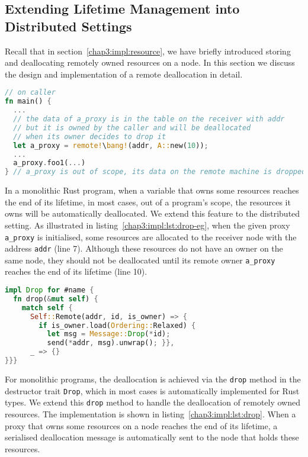 \subsection{Extending Lifetime Management into Distributed Settings}
\label{chap3:impl:lifetime}
Recall that in section~\ref{chap3:impl:resource}, we have briefly introduced storing and deallocating remotely owned resources on a node. In this section we discuss the design and implementation of a remote deallocation in detail. 
\begin{lstlisting}[language=Rust, style=boxed, basicstyle=\footnotesize\ttfamily, caption={An example of a remote deallocation}, label=chap3:impl:lst:drop-eg]
// on caller
fn main() {
  ...
  // the data of a_proxy is in the table on the receiver with addr
  // but it is owned by the caller and will be deallocated
  // when its owner decides to drop it
  let a_proxy = remote!\bang!(addr, A::new(10)); 
  ...
  a_proxy.foo1(...)
} // a_proxy is out of scope, its data on the remote machine is dropped
\end{lstlisting}

In a monolithic Rust program, when a variable that owns some resources reaches the end of its lifetime, in most cases, out of a program's scope, the resources it owns will be automatically deallocated. We extend this feature to the distributed setting. As illustrated in listing~\ref{chap3:impl:lst:drop-eg}, when the given proxy \texttt{a\_proxy} is initialised, some resources are allocated to the receiver node with the address \texttt{addr} (line 7). Although these resources do not have an owner on the same node, they should not be deallocated until its remote owner \texttt{a\_proxy} reaches the end of its lifetime (line 10).

\begin{lstlisting}[language=Rust, style=boxed, basicstyle=\footnotesize\ttfamily, caption={The implementation of a remote deallocation}, label=chap3:impl:lst:drop]
impl Drop for #name {
  fn drop(&mut self) {
    match self {
      Self::Remote(addr, id, is_owner) => {
        if is_owner.load(Ordering::Relaxed) {
          let msg = Message::Drop(*id);
          send(*addr, msg).unwrap(); }},
      _ => {}
}}}
\end{lstlisting}

For monolithic programs, the deallocation is achieved via the \texttt{drop} method in the destructor trait \texttt{Drop}, which in most cases is automatically implemented for Rust types. We extend this \texttt{drop} method to handle the deallocation of remotely owned resources. The implementation is shown in listing~\ref{chap3:impl:lst:drop}.
When a proxy that owns some resources on a node reaches the end of its lifetime, a serialised deallocation message is automatically sent to the node that holds these resources. 

